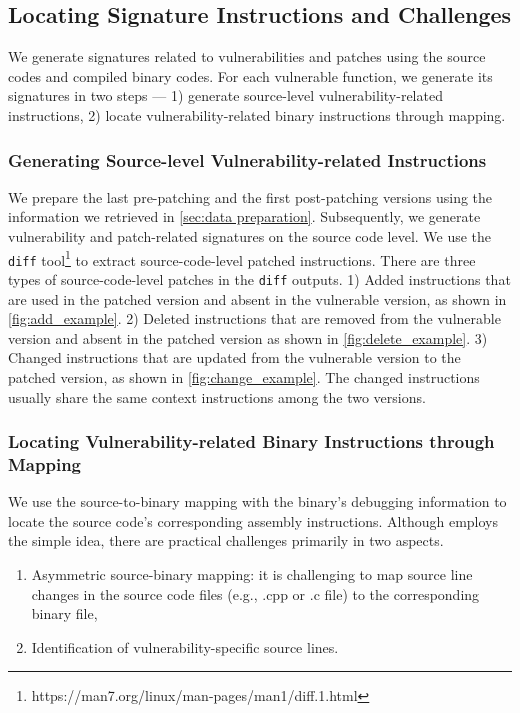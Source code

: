 \subsection{Locating Signature Instructions and Challenges}
\label{sec:Vulnerability and patch signature generation}
We generate signatures related to vulnerabilities and patches using the source codes and compiled binary codes. 
For each vulnerable function, we generate its signatures in two steps --- 1) generate source-level vulnerability-related instructions, 2) locate vulnerability-related binary instructions through mapping. 


\subsubsection{Generating Source-level Vulnerability-related Instructions} 
We prepare the last pre-patching and the first post-patching versions using the information we retrieved in \autoref{sec:data preparation}. 
Subsequently, we generate vulnerability and patch-related signatures on the source code level. 
We use the \texttt{diff} tool\footnote{https://man7.org/linux/man-pages/man1/diff.1.html} to extract source-code-level patched instructions.
There are three types of source-code-level patches in the \texttt{diff} outputs. 
1) Added instructions that are used in the patched version and absent in the vulnerable version, as shown in \autoref{fig:add_example}.
2) Deleted instructions that are removed from the vulnerable version and absent in the patched version as shown in \autoref{fig:delete_example}. 
3) Changed instructions that are updated from the vulnerable version to the patched version, as shown in \autoref{fig:change_example}. 
The changed instructions usually share the same context instructions among the two versions.
 

\subsubsection{Locating Vulnerability-related Binary Instructions through Mapping} 
We use the source-to-binary mapping with the binary's debugging information to locate the source code's corresponding assembly instructions.
Although \name employs the simple idea, there are practical challenges primarily in two aspects. 
\begin{enumerate}
 \item Asymmetric source-binary mapping: it is challenging to map source line changes in the source code files (e.g., .cpp or .c file) to the corresponding binary file,
 \item Identification of vulnerability-specific source lines.
\end{enumerate}



